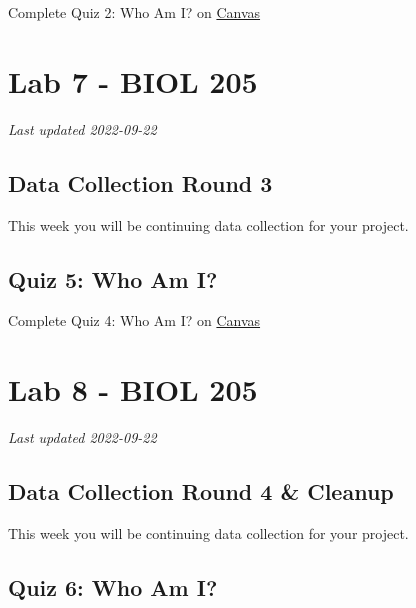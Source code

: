 \documentclass[
]{book}
\begin{document}
Complete Quiz 2: Who Am I? on \href{https://canvas.ubc.ca/courses/113910}{Canvas}

\hypertarget{part-lab-7---biol-205}{%
\part*{Lab 7 - BIOL 205}\label{part-lab-7---biol-205}}

\emph{Last updated 2022-09-22}

\hypertarget{data-collection-round-3}{%
\chapter*{Data Collection Round 3}\label{data-collection-round-3}}

This week you will be continuing data collection for your project.

\hypertarget{quiz-5-who-am-i}{%
\chapter*{Quiz 5: Who Am I?}\label{quiz-5-who-am-i}}

Complete Quiz 4: Who Am I? on \href{https://canvas.ubc.ca/courses/113910}{Canvas}

\hypertarget{part-lab-8---biol-205}{%
\part*{Lab 8 - BIOL 205}\label{part-lab-8---biol-205}}

\emph{Last updated 2022-09-22}

\hypertarget{data-collection-round-4-cleanup}{%
\chapter*{Data Collection Round 4 \& Cleanup}\label{data-collection-round-4-cleanup}}

This week you will be continuing data collection for your project.

\hypertarget{quiz-6-who-am-i}{%
\chapter*{Quiz 6: Who Am I?}\label{quiz-6-who-am-i}}
\end{document}
